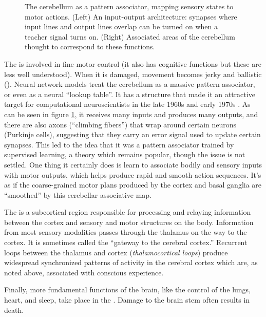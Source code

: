 \begin{figure}[h]
\centering
{}
\caption[From lecture slides by David Touretzky.]{The cerebellum as a pattern associator, mapping sensory states to motor actions. (Left) An input-output architecture: synapses where input lines and output lines overlap can be turned on when a teacher signal turns on. (Right) Associated areas of the cerebellum thought to correspond to these functions.}
\label{cerebellum_associator}
\end{figure}

The  is involved in fine motor control (it also has cognitive functions but these are less well understood). When it is damaged, movement becomes jerky and ballistic (). Neural network models treat the cerebellum as a massive pattern associator, or even as a neural ``lookup table''. It has a structure that made it an attractive target for computational neuroscientists in the late 1960s and early 1970s \cite{marr1991theory}. As can be seen in figure \ref{cerebellum_associator}, it receives many inputs and produces many outputs, and there are also axons (``climbing fibers'') that wrap around certain neurons (Purkinje cells), suggesting that they carry an error signal used to update certain synapses. This led to the idea that it was a pattern associator trained by supervised learning, a theory which remains popular, though the issue is not settled. One thing it certainly does is learn to associate bodily and sensory inputs with motor outputs, which helps produce rapid and smooth action sequences. It's as if the coarse-grained motor plans produced by the cortex and basal ganglia are ``smoothed'' by this cerebellar associative map.

The  is a subcortical region responsible for  processing and relaying information between the cortex and  sensory and motor structures on the body. Information from most  sensory modalities passes through the thalamus on the way to the cortex. It is sometimes called the ``gateway to the cerebral cortex.''  Recurrent loops between the thalamus and cortex (\emph{thalamocortical loops}) produce widespread synchronized patterns of activity in the cerebral cortex which are, as noted above, associated with conscious experience.

Finally, more fundamental functions of the brain, like the control of the lungs, heart, and sleep, take place in the . Damage to the brain stem often results in death.
